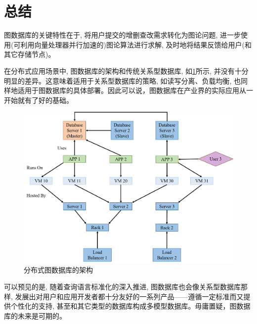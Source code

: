 \section{总结}

图数据库的关键特性在于, 将用户提交的增删查改需求转化为图论问题, 进一步使用(可利用向量处理器并行加速的)图论算法进行求解, 及时地将结果反馈给用户(和其它存储节点)。

在分布式应用场景中, 图数据库的架构和传统关系型数据库, 如\cref{fig:graphDB-DistArchtec}所示, 并没有十分明显的差异。这意味着适用于关系型数据库的策略, 如读写分离、负载均衡, 也同样地适用于图数据库的具体部署。因此可以说，图数据库在产业界的实际应用从一开始就有了好的基础。

\begin{figure}[H]
	\centering
	\includegraphics[width=\textwidth]{images/27.png}
	\caption{分布式图数据库的架构}
	\label{fig:graphDB-DistArchtec}
\end{figure}

可以预见的是, 随着查询语言标准化的深入推进, 图数据库也会像关系型数据库那样, 发展出对用户和应用开发者都十分友好的一系列产品——遵循一定标准而又提供个性化的支持, 甚至和其它类型的数据库构成多模型数据库。毋庸置疑，图数据库的未来是可期的。 
